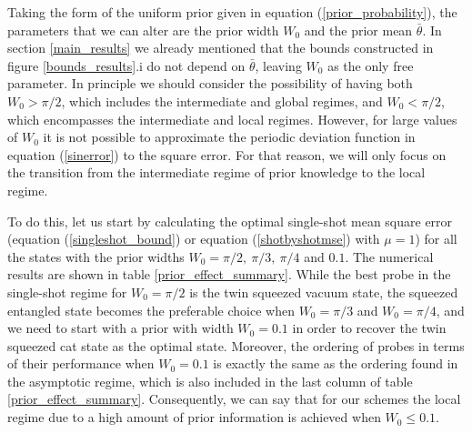 Taking the form of the uniform prior given in equation (\ref{prior_probability}), the parameters that we can alter are the prior width $W_0$ and the prior mean $\bar{\theta}$. In section \ref{main_results} we already mentioned that the bounds constructed in figure \ref{bounds_results}.i do not depend on $\bar{\theta}$, leaving $W_0$ as the only free parameter. In principle we should consider the possibility of having both $W_0>\pi/2$, which includes the intermediate and global regimes, and $W_0<\pi/2$, which encompasses the intermediate and local regimes. However, for large values of $W_0$ it is not possible to approximate the periodic deviation function in equation (\ref{sinerror}) to the square error. For that reason, we will only focus on the transition from the intermediate regime of prior knowledge to the local regime. 

To do this, let us start by calculating the optimal single-shot mean square error (equation (\ref{singleshot_bound}) or equation (\ref{shotbyshotmse}) with $\mu = 1$) for all the states with the prior widths $W_0 = \pi/2,~\pi/3,~\pi/4$ and $0.1$. The numerical results are shown in table \ref{prior_effect_summary}. While the best probe in the single-shot regime for $W_0 = \pi/2$ is the twin squeezed vacuum state, the squeezed entangled state becomes the preferable choice when $W_0 = \pi/3$ and $W_0 = \pi/4$, and we need to start with a prior with width $W_0 = 0.1$ in order to recover the twin squeezed cat state as the optimal state. Moreover, the ordering of probes in terms of their performance when $W_0 = 0.1$ is exactly the same as the ordering found in the asymptotic regime, which is also included in the last column of table \ref{prior_effect_summary}. Consequently, we can say that for our schemes the local regime due to a high amount of prior information is achieved when $W_0 \leqslant 0.1$.


